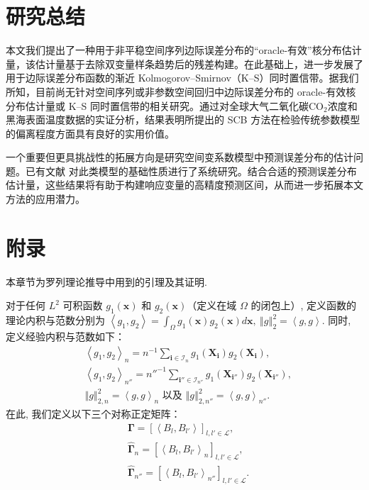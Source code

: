 \documentclass[a4paper,openay,14pt]{ctexbook}
\numberwithin{equation}{section}
\numberwithin{lem}{section}
\newcommand{\chapterwithfancyheader}[1]{  
    \chapter{#1} %
    \thispagestyle{fancy} %
}
\begin{document}
\chapterwithfancyheader{研究总结}\label{SEC: Conclusion}
本文我们提出了一种用于非平稳空间序列边际误差分布的“oracle-有效”核分布估计量，该估计量基于去除双变量样条趋势后的残差构建。在此基础上，进一步发展了用于边际误差分布函数的渐近 Kolmogorov–Smirnov（K–S）同时置信带。据我们所知，目前尚无针对空间序列或非参数空间回归中边际误差分布的 oracle-有效核分布估计量或 K–S 同时置信带的相关研究。通过对全球大气二氧化碳CO$_2$浓度和黑海表面温度数据的实证分析，结果表明所提出的 SCB 方法在检验传统参数模型的偏离程度方面具有良好的实用价值。

一个重要但更具挑战性的拓展方向是研究空间变系数模型中预测误差分布的估计问题。已有文献 \cite{mu2018estimation,wang2020efficient,mu2020spatial} 对此类模型的基础性质进行了系统研究。结合合适的预测误差分布估计量，这些结果将有助于构建响应变量的高精度预测区间，从而进一步拓展本文方法的应用潜力。

\backmatter
\newpage
{}  






\newpage
\pagestyle{fancy}
\chapterwithfancyheader{附录}\label{SEC: proof}
\setcounter{section}{0}
\setcounter{equation}{0}
\def\theequation{A.\arabic{equation}}
\def\thesection{A}
\renewcommand{\thelemma}{A.\arabic{lemma}} 

本章节为罗列理论推导中用到的引理及其证明. 

对于任何 $L^2$ 可积函数 $g_1(\boldsymbol{x})$ 和 $g_2(\boldsymbol{x})$（定义在域 $\Omega$ 的闭包上）, 定义函数的理论内积与范数分别为
\(\left<g_1,g_2\right> = \int_{\Omega}g_1(\boldsymbol{x})g_2(\boldsymbol{x})d\boldsymbol{x},~\left\Vert g\right\Vert^2_2 = \left<g,g\right>\). 同时, 定义经验内积与范数如下：
\begin{align*}
 &\left<g_1,g_2\right>_{n} = n^{-1}\sum_{\mathbf{i} \in \mathcal{I}_n} g_1(\boldsymbol{X}_{\mathbf{i}})g_2(\boldsymbol{X}_{\mathbf{i}}),\\
 & \left<g_1,g_2\right>_{n''} = n''^{-1}\sum_{\mathbf{i}''\in\mathcal{I}_{n''}}g_1(\boldsymbol{X}_{\mathbf{i}''})g_2(\boldsymbol{X}_{\mathbf{i}''}),\\
 & \left\Vert g\right\Vert^{2}_{2,n} = \left<g,g\right>_{n}\text{ 以及 } \left\Vert g\right\Vert^{2}_{2,n''} = \left<g,g\right>_{n''}.
\end{align*}
在此, 我们定义以下三个对称正定矩阵：
\begin{align}
    &\bm{\Gamma} = \left[\left\langle B_l,B_{l'}\right\rangle\right]_{l,l'\in\mathcal{L}}, \label{EQU:Gammalambda}\\
    &\hat{\bm{\Gamma}}_{n} = \left[\left\langle B_l,B_{l'}\right\rangle_{n}\right]_{l,l'\in\mathcal{L}},\label{EQU:hatGammalambdan}\\
    &\hat{\bm{\Gamma}}_{n''} = \left[\left\langle B_l,B_{l'}\right\rangle_{n''}\right]_{l,l'\in\mathcal{L}}. \label{EQU:hatGammalambdan''}
\end{align}
\end{document}
